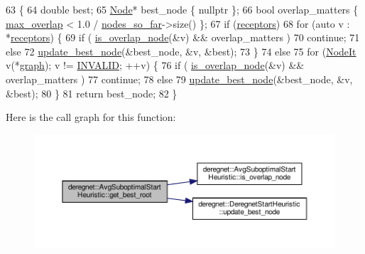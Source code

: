 \begin{DoxyCode}
63                                                  \{
64     \textcolor{keywordtype}{double} best;
65     \hyperlink{namespacederegnet_a744bad34f2de9856d36715a445f027f3}{Node}* best\_node \{ \textcolor{keyword}{nullptr} \};
66     \textcolor{keywordtype}{bool} overlap\_matters \{ \hyperlink{classderegnet_1_1AvgSuboptimalStartHeuristic_a6e019ada1557663d456e7f81757d14ab}{max\_overlap} < 1.0 / \hyperlink{classderegnet_1_1AvgSuboptimalStartHeuristic_ac07c2b61bf03b25e1bd87cb353bd4597}{nodes\_so\_far}->size() \};
67     \textcolor{keywordflow}{if} (\hyperlink{classderegnet_1_1DeregnetStartHeuristic_ab80c046ff2b7c64086fceb84987b3e50}{receptors})
68         \textcolor{keywordflow}{for} (\textcolor{keyword}{auto} v : *\hyperlink{classderegnet_1_1DeregnetStartHeuristic_ab80c046ff2b7c64086fceb84987b3e50}{receptors}) \{
69             \textcolor{keywordflow}{if} ( \hyperlink{classderegnet_1_1AvgSuboptimalStartHeuristic_abc4fa54576da31f3037f2c1aa2cd9140}{is\_overlap\_node}(&v) && overlap\_matters )
70                 \textcolor{keywordflow}{continue};
71             \textcolor{keywordflow}{else}
72                 \hyperlink{classderegnet_1_1DeregnetStartHeuristic_a50179ff9db4d416b93ff41d1dcee1358}{update\_best\_node}(&best\_node, &v, &best);
73         \}
74     \textcolor{keywordflow}{else}
75         \textcolor{keywordflow}{for} (\hyperlink{namespacederegnet_ac34314e1b5f456fc6d1bb9d96316de4a}{NodeIt} v(*\hyperlink{classderegnet_1_1DeregnetStartHeuristic_a4da8e53fc7c0fa3dbe0e3ef07296d75e}{graph}); v != \hyperlink{usinglemon_8hpp_adf770fe2eec438e3758ffe905dbae208}{INVALID}; ++v) \{
76             \textcolor{keywordflow}{if} ( \hyperlink{classderegnet_1_1AvgSuboptimalStartHeuristic_abc4fa54576da31f3037f2c1aa2cd9140}{is\_overlap\_node}(&v) && overlap\_matters )
77                 \textcolor{keywordflow}{continue};
78             \textcolor{keywordflow}{else}
79                 \hyperlink{classderegnet_1_1DeregnetStartHeuristic_a50179ff9db4d416b93ff41d1dcee1358}{update\_best\_node}(&best\_node, &v, &best);
80         \}
81     \textcolor{keywordflow}{return} best\_node;
82 \}
\end{DoxyCode}
Here is the call graph for this function\+:\nopagebreak
\begin{figure}[H]
\begin{center}
\leavevmode
\includegraphics[width=350pt]{classderegnet_1_1AvgSuboptimalStartHeuristic_a732194c0c56e6f28839114e3ab119109_cgraph}
\end{center}
\end{figure}

